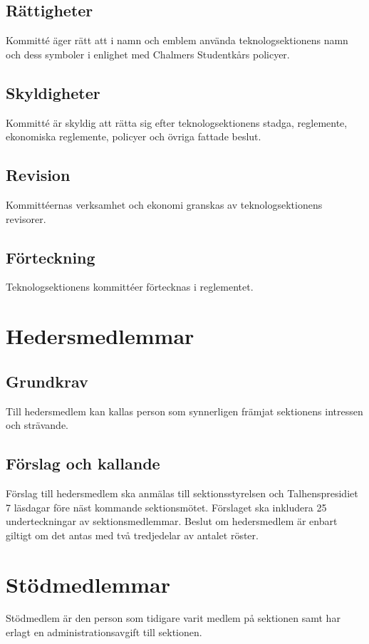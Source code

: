 \documentclass[a4paper]{dtek}
\begin{document}
\subsection{Rättigheter}
Kommitté äger rätt att i namn och emblem använda teknologsektionens namn och dess symboler i enlighet med Chalmers Studentkårs policyer.
\subsection{Skyldigheter}
Kommitté är skyldig att rätta sig efter teknologsektionens stadga, reglemente, ekonomiska reglemente, policyer och övriga fattade beslut.
\subsection{Revision}
Kommittéernas verksamhet och ekonomi granskas av teknologsektionens revisorer.
\subsection{Förteckning}
Teknologsektionens kommittéer förtecknas i reglementet.
\newpage

\section{Hedersmedlemmar}
\subsection{Grundkrav}
Till hedersmedlem kan kallas person som synnerligen främjat sektionens intressen och strävande.
\subsection{Förslag och kallande}
Förslag till hedersmedlem ska anmälas till sektionsstyrelsen och Talhenspresidiet 7 läsdagar före näst kommande sektionsmötet.
Förslaget ska inkludera 25 underteckningar av sektionsmedlemmar.
Beslut om hedersmedlem är enbart giltigt om det antas med två tredjedelar av antalet röster.
\newpage

\section{Stödmedlemmar}
Stödmedlem är den person som tidigare varit medlem på sektionen samt har erlagt en administrationsavgift till sektionen.
\newpage
\end{document}
